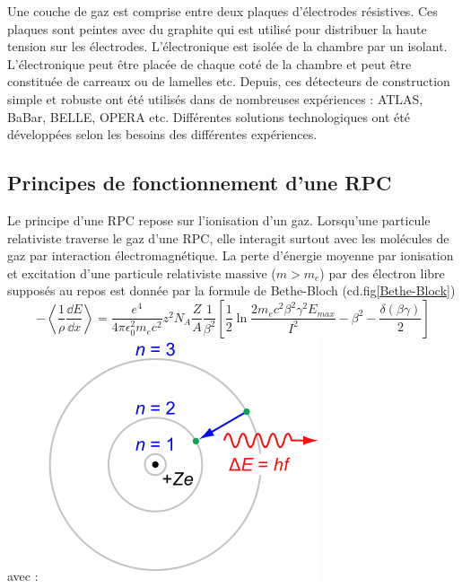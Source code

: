 Une couche de gaz est comprise entre deux plaques d'électrodes résistives. Ces plaques sont peintes avec du graphite qui est utilisé pour distribuer la haute tension sur les électrodes. L'électronique est isolée de la chambre par un isolant. L'électronique peut être placée de chaque coté de la chambre et peut être constituée de carreaux ou de lamelles etc.
Depuis, ces détecteurs de construction simple et robuste ont été utilisés dans de nombreuses expériences : ATLAS, BaBar, BELLE, OPERA etc. Différentes solutions technologiques ont été développées selon les besoins des différentes expériences.

\subsection{Principes de fonctionnement d'une RPC}
Le principe d'une RPC repose sur l'ionisation d'un gaz. Lorsqu'une particule relativiste traverse le gaz d'une RPC, elle interagit surtout avec les molécules de gaz par interaction électromagnétique. La perte d'énergie moyenne par ionisation et excitation d'une particule relativiste massive ($m>m_{e}$) par des électron libre supposés au repos est donnée par la formule de Bethe-Bloch (cd.fig\ref{Bethe-Block})
\begin{equation}
-\left<\frac{1}{\rho}\frac{\dd E}{\dd x}\right>=\frac{e^{4}}{4\pi \epsilon_{0}^{2}m_{e}c^{2}}z^{2}N_{A}\frac{Z}{A}\frac{1}{\beta^{2}}\left[\frac{1}{2}\ln\frac{2m_{e}c^{2}\beta^{2}\gamma^{2}E_{max}}{I^{2}}-\beta^{2}-\frac{\delta(\beta\gamma)}{2}\right]
\end{equation}
avec :
	\marginpar
{
	\centering
	\includegraphics[width=\marginparwidth]{RPC/Photon.png}
	\label{photon}
}
\marginpar
